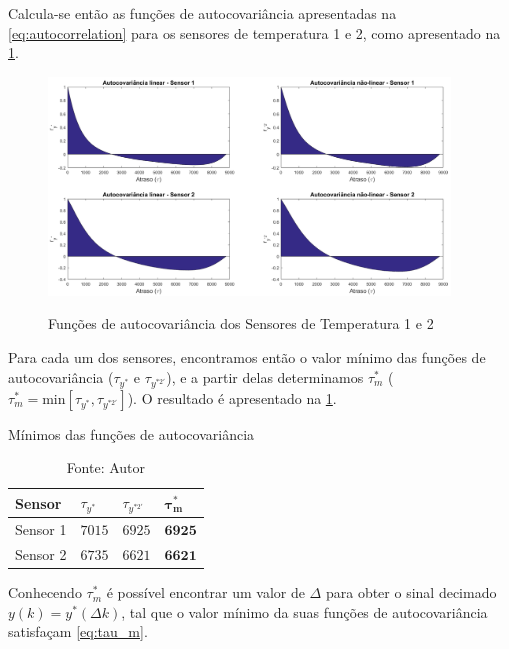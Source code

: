 \begin{apendicesenv}
Calcula-se então as funções de autocovariância apresentadas na \cref{eq:autocorrelation} para os
sensores de temperatura 1 e 2, como apresentado na \cref{fig:autocorrelationS1S2}.

\begin{figure}[h]
	\caption{Funções de autocovariância dos Sensores de Temperatura 1 e 2}
	\begin{center}
		\includegraphics[width=0.95\textwidth]{./5_images/AutocorrelationS1S2.png} 
		\label{fig:autocorrelationS1S2}
	\end{center}
	\centering
\end{figure}

Para cada um dos sensores, encontramos então o valor mínimo das funções de autocovariância
($\tau_{y^{*}}$ e $\tau_{y^{*2'}}$), e a partir delas determinamos $\tau_m^*$
($\tau_{m}^{*} = \mathrm{min} \left[ \tau_{y^*} , \tau_{y^{*2'}} \right]$).
O resultado é apresentado na \cref{tab:tau_s1s2}.

\begin{table}[h]
	\centering
	\caption{Mínimos das funções de autocovariância}
	\label{tab:tau_s1s2}
	\begin{tabular}{llll} \toprule
		{Sensor}		& {$\tau_{y^{*}}$}		& {$\tau_{y^{*2'}}$}		& {$\pmb{\tau}_{\pmb{m}}^{\pmb{*}}$}		\\ \midrule
		Sensor 1		& $7015$				& $6925$					& $\pmb{6}\pmb{9}\pmb{2}\pmb{5}$			\\
		Sensor 2		& $6735$				& $6621$					& $\pmb{6}\pmb{6}\pmb{2}\pmb{1}$			\\ \bottomrule
	\end{tabular}
	\caption*{Fonte: Autor}
\end{table}

Conhecendo $\tau_{m}^{*}$ é possível encontrar um valor de $\Delta$ para obter o sinal decimado
$y(k) = y^*(\Delta k)$, tal que o valor mínimo da suas funções de autocovariância satisfaçam
\cref{eq:tau_m}.


\end{apendicesenv}
